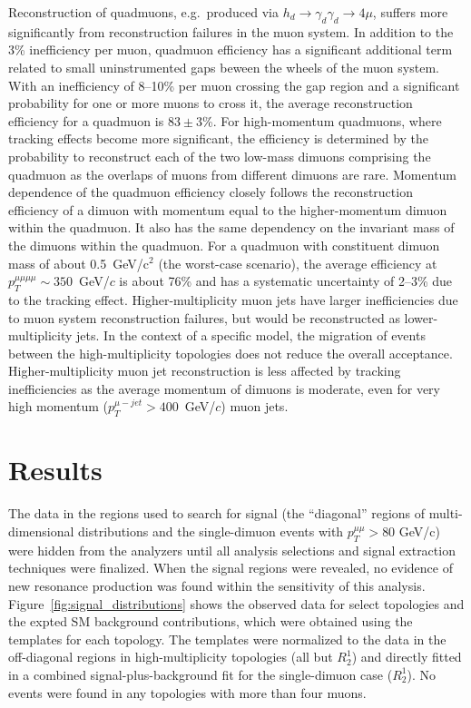 Reconstruction of quadmuons, e.g.\ produced via $h_d \to \gamma_d \gamma_d \to 4 \mu$, suffers more significantly from reconstruction failures in the muon system. In addition to the 3\% inefficiency per muon, quadmuon efficiency has a significant additional term related to small uninstrumented gaps beween the wheels of the muon system. With an inefficiency of 8--10\% per muon crossing the gap region and a significant probability for one or more muons to cross it, the average reconstruction efficiency for a quadmuon is $83\pm 3$\%. For high-momentum quadmuons, where tracking effects become more significant, the efficiency is determined by the probability to reconstruct each of the two low-mass dimuons comprising the quadmuon as the overlaps of muons from different dimuons are rare. Momentum dependence of the quadmuon efficiency closely follows the reconstruction efficiency of a dimuon with momentum equal to the higher-momentum dimuon within the quadmuon. It also has the same dependency on the invariant mass of the dimuons within the quadmuon. For a quadmuon with constituent dimuon mass of about 0.5~GeV/c$^2$ (the worst-case scenario), the average efficiency at $p_T^{\mu\mu\mu\mu}\sim350$~GeV/$c$ is about 76\% and has a systematic uncertainty of 2--3\% due to the tracking effect. Higher-multiplicity muon jets have larger inefficiencies due to muon system reconstruction failures, but would be reconstructed as lower-multiplicity jets. In the context of a specific model, the migration of events between the high-multiplicity topologies does not reduce the overall acceptance. Higher-multiplicity muon jet reconstruction is less affected by tracking inefficiencies as the average momentum of dimuons is moderate, even for very high momentum ($p_T^{\mu-jet}>400$~GeV/$c$) muon jets.

\section{Results}

The data in the regions used to search for signal (the ``diagonal'' regions of multi-dimensional distributions and the single-dimuon events with $p_T^{\mu\mu}>80$ GeV/c) were hidden from the analyzers until all analysis selections and signal extraction techniques were finalized. When the signal regions were revealed, no evidence of new resonance production was found within the sensitivity of this analysis. Figure~\ref{fig:signal_distributions} shows the observed data for select topologies and the expted SM background contributions, which were obtained using the templates for each topology.  The templates were normalized to the data in the off-diagonal regions in high-multiplicity topologies (all but $R^1_2$) and directly fitted in a combined signal-plus-background fit for the single-dimuon case ($R^1_2$). No events were found in any topologies with more than four muons.

